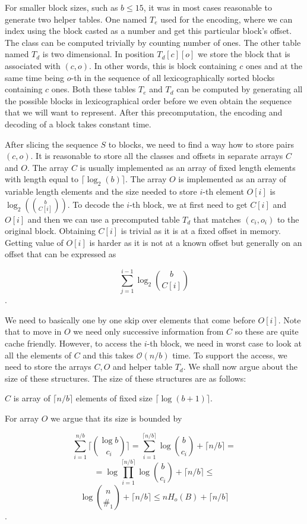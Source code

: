 For smaller block sizes, such as $b\leq 15$, it was in most cases reasonable to
generate two helper tables. One named $T_e$ used for the encoding, where we can
index using the block casted as a number and get this particular block's offset.
The class can be computed trivially by counting number of ones. The other table
named $T_d$ is two dimensional. In position $T_d[c][o]$ we store the block that
is associated with $(c, o)$. In other words, this is block containing $c$ ones
and at the same time being $o$-th in the sequence of all lexicographically sorted
blocks containing $c$ ones. Both these tables $T_e$ and $T_d$ can be computed
by generating all the possible blocks in lexicographical order before we even
obtain the sequence that we will want to represent. After this precomputation,
the encoding and decoding of a block takes constant time.

After slicing the sequence $S$ to blocks, we need to find a way how to store
pairs $(c, o)$. It is reasonable to store all the classes and offsets in separate
arrays $C$ and $O$. The array $C$ is usually implemented as an array of fixed length
elements with length equal to $\lceil \log_2(b)\rceil$. The array $O$ is implemented as an
array of variable length elements and the size needed to store $i$-th element $O[i]$ is
$\log_2({b\choose C[i]})$. To decode the $i$-th block, we at first need to get
$C[i]$ and $O[i]$ and then we can use a precomputed table $T_d$ that matches $(c_i, o_i)$
to the original block. Obtaining $C[i]$ is trivial as it is at a fixed offset in
memory. Getting value of $O[i]$ is harder as it is not at a known offset but generally
on an offset that can be expressed as

                $$\sum_{j=1}^{i-1} \log_2{b\choose C[i]}$$.

We need to basically one by one skip over elements that come before $O[i]$.
Note that to move in $O$ we need only successive information from $C$ so these
are quite cache friendly. However, to access the $i$-th block, we need in worst
case to look at all the elements of $C$ and this takes $\mathcal{O}(n/b)$ time. To support
the access, we need to store the arrays $C, O$ and helper table $T_d$. We shall
now argue about the size of these structures. The size of these structures are
as follows:

$C$ is array of $\lceil n/b \rceil$ elements of fixed size $\lceil \log(b+1) \rceil$.

For array $O$ we argue that its size is bounded by

$$\sum_{i=1}^{n/b} \bigg\lceil{\log b\choose c_i}\bigg\rceil =
\sum_{i=1}^{\lceil n/b \rceil} \log {b\choose c_i} + \lceil n/b \rceil =$$
$$=\log\prod_{i=1}^{\lceil n/b \rceil} \log {b\choose c_i} + \lceil n/b \rceil \leq $$
$$\log{n\choose \#_1} +  \lceil n/b \rceil \leq nH_o(B) +  \lceil n/b \rceil$$.

